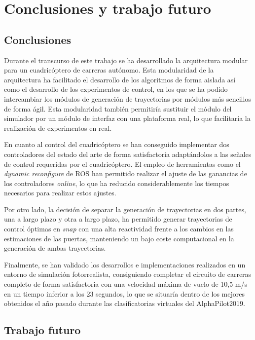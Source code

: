 \chapter{Conclusiones y trabajo futuro}

\section{Conclusiones}

Durante el transcurso de este trabajo se ha desarrollado la arquitectura modular para un cuadricóptero de carreras autónomo. Esta modularidad de la arquitectura ha facilitado el desarrollo de los algoritmos de forma aislada así como el desarrollo de los experimentos de control, en los que se ha podido intercambiar los módulos de generación de trayectorias por módulos más sencillos de forma ágil. Esta modularidad también permitiría sustituir el módulo del simulador por un módulo de interfaz con una plataforma real, lo que facilitaría la realización de experimentos en real.

En cuanto al control del cuadricóptero se han conseguido implementar dos controladores del estado del arte de forma satisfactoria adaptándolos a las señales de control requeridas por el cuadricóptero. El empleo de herramientas como el \textit{dynamic reconfigure} de ROS han permitido realizar el ajuste de las ganancias de los controladores \textit{online}, lo que ha reducido considerablemente los tiempos necesarios para realizar estos ajustes.

Por otro lado, la decisión de separar la generación de trayectorias en dos partes, una a largo plazo y otra a largo plazo, ha permitido generar trayectorias de control óptimas en \textit{snap} con una alta reactividad frente a los cambios en las estimaciones de las puertas, manteniendo un bajo coste computacional en la generación de ambas trayectorias.

Finalmente, se han validado los desarrollos e implementaciones realizados en un entorno de simulación fotorrealista, consiguiendo completar el circuito de carreras completo de forma satisfactoria con una velocidad máxima de vuelo de 10,5 m/s en un tiempo inferior a los 23 segundos, lo que se situaría dentro de los mejores obtenidos el año pasado durante las clasificatorias virtuales del AlphaPilot2019.



\section{Trabajo futuro}

